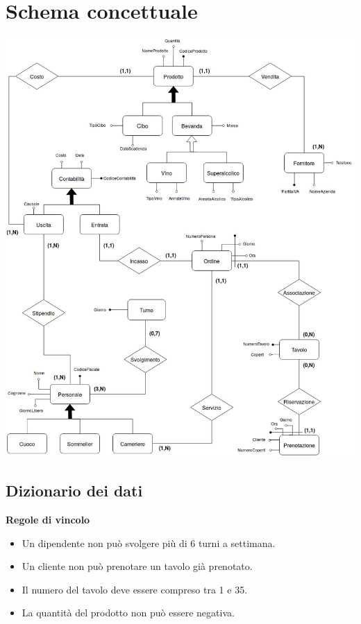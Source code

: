 \section{Schema concettuale} %
\includegraphics[width=1\textwidth]{doc/schema}
\subsection{Dizionario dei dati}

\textbf{Regole di vincolo} 
\begin{itemize}
    \item Un dipendente non può svolgere più di 6 turni a settimana.
    \item Un cliente non può prenotare un tavolo già prenotato.
    \item Il numero del tavolo deve essere compreso tra 1 e 35.
    \item La quantità del prodotto non può essere negativa.
\end{itemize}

